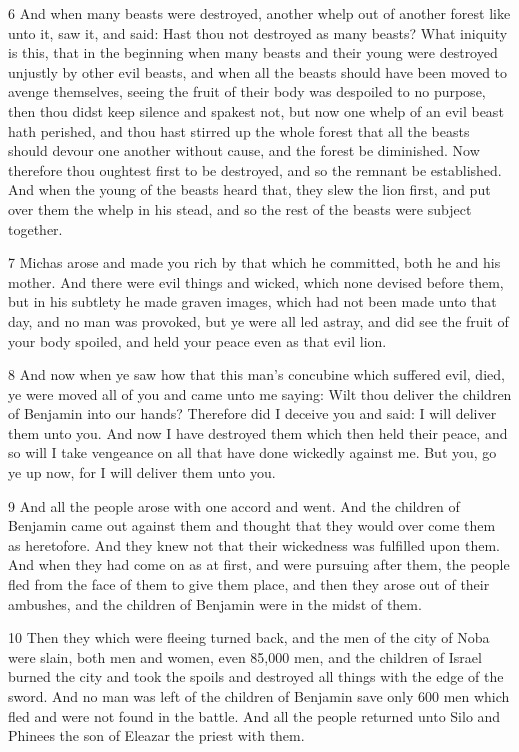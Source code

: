 \par 6 And when many beasts were destroyed, another whelp out of another forest like unto it, saw it, and said: Hast thou not destroyed as many beasts? What iniquity is this, that in the beginning when many beasts and their young were destroyed unjustly by other evil beasts, and when all the beasts should have been moved to avenge themselves, seeing the fruit of their body was despoiled to no purpose, then thou didst keep silence and spakest not, but now one whelp of an evil beast hath perished, and thou hast stirred up the whole forest that all the beasts should devour one another without cause, and the forest be diminished. Now therefore thou oughtest first to be destroyed, and so the remnant be established. And when the young of the beasts heard that, they slew the lion first, and put over them the whelp in his stead, and so the rest of the beasts were subject together.

\par 7 Michas arose and made you rich by that which he committed, both he and his mother. And there were evil things and wicked, which none devised before them, but in his subtlety he made graven images, which had not been made unto that day, and no man was provoked, but ye were all led astray, and did see the fruit of your body spoiled, and held your peace even as that evil lion. 

\par 8 And now when ye saw how that this man's concubine which suffered evil, died, ye were moved all of you and came unto me saying: Wilt thou deliver the children of Benjamin into our hands? Therefore did I deceive you and said: I will deliver them unto you. And now I have destroyed them which then held their peace, and so will I take vengeance on all that have done wickedly against me. But you, go ye up now, for I will deliver them unto you.

\par 9 And all the people arose with one accord and went. And the children of Benjamin came out against them and thought that they would over come them as heretofore. And they knew not that their wickedness was fulfilled upon them. And when they had come on as at first, and were pursuing after them, the people fled from the face of them to give them place, and then they arose out of their ambushes, and the children of Benjamin were in the midst of them. 

\par 10 Then they which were fleeing turned back, and the men of the city of Noba were slain, both men and women, even 85,000 men, and the children of Israel burned the city and took the spoils and destroyed all things with the edge of the sword. And no man was left of the children of Benjamin save only 600 men which fled and were not found in the battle. And all the people returned unto Silo and Phinees the son of Eleazar the priest with them.

